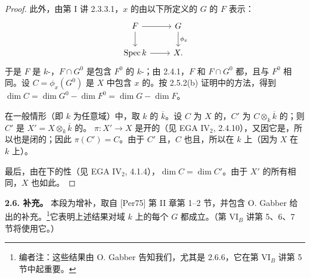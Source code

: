 \begin{proof}
此外，由第 I 讲 2.3.3.1，$x$ 的由以下所定义的 $G$ 的 $F$ 表示：
\[
\begin{tikzcd}
F\arrow[r]\arrow[d]&G\arrow[d,"\phi_x"]\\
\operatorname{Spec}k\arrow[r]&X.
\end{tikzcd}
\]
于是 $F$ 是 $k$-，$F\cap G^0$ 是包含 $F^0$ 的 $k$-；由 2.4.1，$F$ 和 $F\cap G^0$ 都，且与 $F^0$ 相同。设 $C=\phi_x(G^0)$ 是 $X$ 中包含 $x$ 的。按 2.5.2(b) 证明中的方法，得到 $\dim C=\dim G^0-\dim F^0=\dim G-\dim F$。

在一般情形（即 $k$ 为任意域）中，取 $k$ 的 $\overline k$。设 $C$ 为 $X$ 的，$C'$ 为 $C\otimes_k\overline k$ 的；则 $C'$ 是 $X'=X\otimes_k\overline k$ 的。 $\pi:X'\to X$ 是开的（见 EGA IV$_2$, 2.4.10），又因它是，所以也是闭的；因此 $\pi(C')=C$。由于 $C'$ 且，$C$ 也且，所以在 $k$ 上（因为 $X$ 在 $k$ 上）。

最后，由在下的性（见 EGA IV$_2$, 4.1.4），$\dim C=\dim C'$。由于 $X'$ 的所有相同，$X$ 也如此。
\end{proof}

\textbf{2.6. 补充。} 本段为增补，取自 [Per75] 第 II 章第 1--2 节，并包含 O. Gabber 给出的补充。\footnote{编者注：这些结果由 O. Gabber 告知我们，尤其是 2.6.6，它在第 VI$_B$ 讲第 5 节中起重要。}它表明上述结果对域 $k$ 上的每个 $G$ 都成立。（第 VI$_B$ 讲第 5、6、7 节将使用它。）

